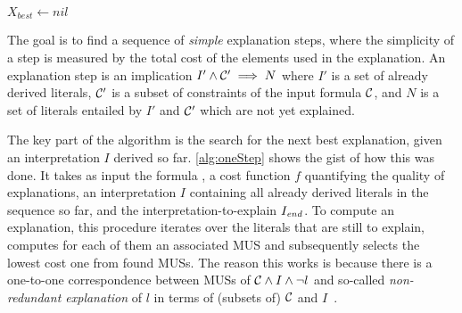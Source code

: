 \newcommand\onestep{\ensuremath{\call{explain-One-Step}}\xspace}

\begin{algorithm}[t]
  \caption{$\onestep(\formulac,f,I,\Iend)$}
  \label{alg:oneStep}
$X_{best} \gets \mathit{nil}$\;
\end{algorithm}


The goal is to find a sequence of \textit{simple} explanation steps, where the simplicity of a step is measured by the total cost of the elements used in the explanation.
An explanation step is an implication $I' \wedge \mathcal{C} ' \implies N$ where $I'$ is a set of already derived literals, $\mathcal{C} '$ is a subset of constraints of the input formula $\mathcal{C} $, and $N$ is a set of literals entailed by $I'$ and $\mathcal{C} '$ which are not yet explained.

%
The key part of the algorithm is the search for the next best explanation, given an interpretation $I$ derived so far. 
\cref{alg:oneStep} shows the gist of how this was done.
It takes as input the formula \formulac, a cost function $f$ quantifying the quality of explanations, an interpretation $I$ containing all already derived literals in the sequence so far, and the interpretation-to-explain $I_\mathit{end} $. 
To compute an explanation, this procedure iterates over the literals that are still to explain, computes for each of them an associated MUS and subsequently selects the lowest cost one from found MUSs.
The reason this works is because there is a one-to-one correspondence between MUSs of $\mathcal{C}  \land I \land \neg l$ and so-called \emph{non-redundant explanation} of $l$ in terms of (subsets of) $\mathcal{C} $ and $I$~\cite{ecai/BogaertsGCG20}. 

